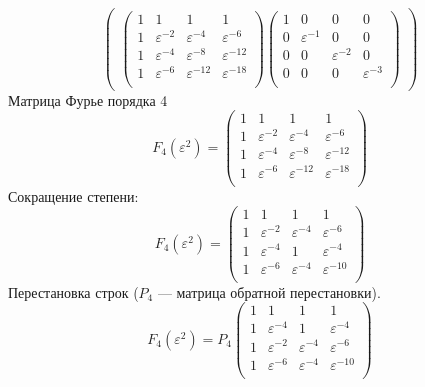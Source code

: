 \[\begin{pmatrix}
\begin{pmatrix}
              1 & 1                & 1                 & 1                 \\
              1 & \varepsilon^{-2} & \varepsilon^{-4}  & \varepsilon^{-6}  \\
              1 & \varepsilon^{-4} & \varepsilon^{-8}  & \varepsilon^{-12} \\
              1 & \varepsilon^{-6} & \varepsilon^{-12} & \varepsilon^{-18} \\
          \end{pmatrix}
          \begin{pmatrix}
              1 & 0                & 0                & 0                \\
              0 & \varepsilon^{-1} & 0                & 0                \\
              0 & 0                & \varepsilon^{-2} & 0                \\
              0 & 0                & 0                & \varepsilon^{-3} \\
          \end{pmatrix}

    \end{pmatrix}
\]
Матрица Фурье порядка 4
\[
    F_4(\varepsilon^2)
    = \begin{pmatrix}
          1 & 1                & 1                 & 1                 \\
          1 & \varepsilon^{-2} & \varepsilon^{-4}  & \varepsilon^{-6}  \\
          1 & \varepsilon^{-4} & \varepsilon^{-8}  & \varepsilon^{-12} \\
          1 & \varepsilon^{-6} & \varepsilon^{-12} & \varepsilon^{-18} \\
    \end{pmatrix}
\]
Сокращение степени:
\[
    F_4(\varepsilon^2)
    = \begin{pmatrix}
          1 & 1                & 1                & 1                 \\
          1 & \varepsilon^{-2} & \varepsilon^{-4} & \varepsilon^{-6}  \\
          1 & \varepsilon^{-4} & 1                & \varepsilon^{-4}  \\
          1 & \varepsilon^{-6} & \varepsilon^{-4} & \varepsilon^{-10} \\
    \end{pmatrix}
\]
Перестановка строк ($P_4$ --- матрица обратной перестановки).
\[
    F_4(\varepsilon^2)
    =
    P_4
    \begin{pmatrix}
        1 & 1                & 1                & 1                 \\
        1 & \varepsilon^{-4} & 1                & \varepsilon^{-4}  \\
        1 & \varepsilon^{-2} & \varepsilon^{-4} & \varepsilon^{-6}  \\
        1 & \varepsilon^{-6} & \varepsilon^{-4} & \varepsilon^{-10} \\
    \end{pmatrix}
\]
